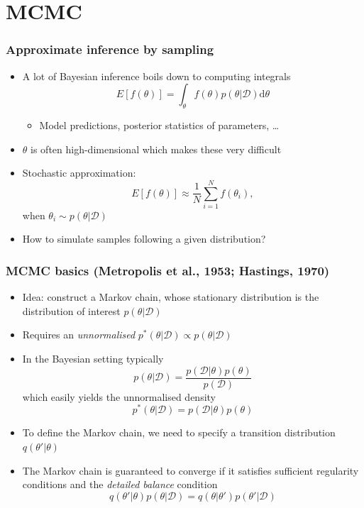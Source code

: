 \documentclass{beamer}
\newcommand{\dataset}{\mathcal{D}}
\newcommand{\parameters}{\theta}
\newcommand{\diff}{\mathrm{d}}
\begin{document}
\section{MCMC}


\begin{frame}
  \frametitle{Approximate inference by sampling}

  \begin{itemize}
  \item A lot of Bayesian inference boils down to computing integrals
    $$ E[f(\parameters)] = \int_\parameters f(\parameters) p(\parameters | \dataset) \diff\parameters $$
    \begin{itemize}
    \item Model predictions, posterior statistics of parameters, \dots
    \end{itemize}
  \item $\parameters$ is often high-dimensional which makes these very difficult
  \item Stochastic approximation:
    $$ E[f(\parameters)] \approx \frac{1}{N} \sum_{i=1}^N f(\parameters_i), $$
    when $\parameters_i \sim p(\parameters | \dataset)$
  \item How to simulate samples following a given distribution?
  \end{itemize}
\end{frame}

\begin{frame}
  \frametitle{MCMC basics (Metropolis et al., 1953; Hastings, 1970)}

  \begin{itemize}
  \item Idea: construct a Markov chain, whose stationary distribution
    is the distribution of interest $p(\parameters | \dataset)$
  \item Requires an \emph{unnormalised} $p^*(\parameters | \dataset) \propto
    p(\parameters | \dataset)$
  \item In the Bayesian setting typically
    $$ p(\parameters | \dataset) = \frac{p(\dataset | \parameters) p(\parameters)}{p(\dataset)} $$
    which easily yields the unnormalised density
    $$ p^*(\parameters | \dataset) = p(\dataset | \parameters) p(\parameters) $$
  \item To define the Markov chain, we need to specify a transition
    distribution $q(\parameters' | \parameters)$
  \item The Markov chain is guaranteed to converge if it satisfies
    sufficient regularity conditions and the \emph{detailed balance}
    condition
    $$ q(\parameters' | \parameters) p(\parameters | \dataset) =
       q(\parameters | \parameters') p(\parameters' | \dataset) $$
  \end{itemize}
\end{frame}
\end{document}
